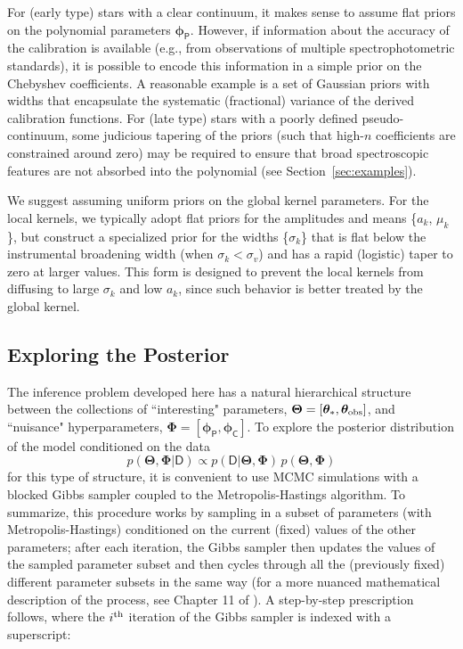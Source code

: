 \documentclass[iop,floatfix,numberedappendix,twocolappendix]{emulateapj}
\newcommand{\vD}{\mathsf{D}}
\newcommand{\vt}{ {\bm \theta}}
\newcommand{\vT}{ {\bm \Theta}}
\newcommand{\vp}{ {\bm \phi}}
\newcommand{\vP}{ {\bm \Phi}}
\newcommand{\cheb}{ \vp_{\mathsf{P}}}
\newcommand{\cov}{ \vp_{\mathsf{C}}}
\begin{document}
For (early type) stars with a clear continuum, it makes sense to assume flat priors on the 
polynomial parameters $\cheb$.  However, if information about the accuracy of the calibration is 
available (e.g., from observations of multiple spectrophotometric standards), it is possible to 
encode this information in a simple prior on the Chebyshev coefficients.  A reasonable example is a 
set of Gaussian priors with widths that encapsulate the systematic (fractional) variance of the 
derived calibration functions.  For (late type) stars with a poorly defined pseudo-continuum, 
some judicious tapering of the priors (such that high-$n$ coefficients are constrained around zero) 
may be required to ensure that broad spectroscopic features are not absorbed into the polynomial 
(see Section~\ref{sec:examples}). 

We suggest assuming uniform priors on the global kernel parameters.  For the local kernels, we 
typically adopt flat priors for the amplitudes and means \{$a_k$, $\mu_k$\}, but construct a 
specialized prior for the widths \{$\sigma_k$\} that is flat below the instrumental broadening 
width (when $\sigma_k < \sigma_v$) and has a rapid (logistic) taper to zero at larger values.  This 
form is designed to prevent the local kernels from diffusing to large $\sigma_k$ and low $a_k$,
since such behavior is better treated by the global kernel.  


\subsection{Exploring the Posterior} \label{subsec:MCMC}

The inference problem developed here has a natural hierarchical structure between the collections 
of ``interesting" parameters, $\vT = [\vt_{\ast}, \vt_{\rm obs}]$, and ``nuisance" hyperparameters, 
$\vP = [\cheb, \cov]$.  To explore the posterior distribution of the model conditioned on the data
\begin{equation} 
p(\vT, \vP | \vD) \propto p(\vD | \vT, \vP) \, p(\vT, \vP)
\label{eqn:post}
\end{equation}
for this type of structure, it is convenient to use MCMC simulations with a blocked Gibbs 
sampler coupled to the Metropolis-Hastings algorithm.  To summarize, this procedure works by 
sampling in a subset of parameters (with Metropolis-Hastings) conditioned on the current (fixed) 
values of the other parameters; after each iteration, the Gibbs sampler then updates the values of 
the sampled parameter subset and then cycles through all the (previously fixed) different parameter 
subsets in the same way (for a more nuanced mathematical description of the process, see Chapter 11 
of \citealt{gelman13}).  A step-by-step prescription follows, where the $i^{\rm th}$ 
iteration of the Gibbs sampler is indexed with a superscript: \\
\end{document}
